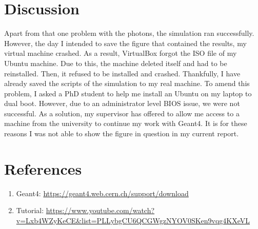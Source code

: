 \documentclass[a4paper,12pt]{extarticle}
\begin{document}
\section{Discussion}
Apart from that one problem with the photons, the simulation ran successfully. However, the day I intended to save the figure that contained the results, my virtual machine crashed. As a result, VirtualBox forgot the ISO file of my Ubuntu machine. Due to this, the machine deleted itself and had to be reinstalled. Then, it refused to be installed and crashed. Thankfully, I have already saved the scripts of the simulation to my real machine. To amend this problem, I asked a PhD student to help me install an Ubuntu on my laptop to dual boot. However, due to an administrator level BIOS issue, we were not successful. As a solution, my supervisor has offered to allow me access to a machine from the university to continue my work with Geant4. It is for these reasons I was not able to show the figure in question in my current report.

\section{References}
\begin{enumerate}
    \item Geant4: \url{https://geant4.web.cern.ch/support/download}
    \item Tutorial: \url{https://www.youtube.com/watch?v=Lxb4WZyKeCE&list=PLLybgCU6QCGWgzNYOV0SKen9vqg4KXeVL} 
\end{enumerate}
\end{document}

